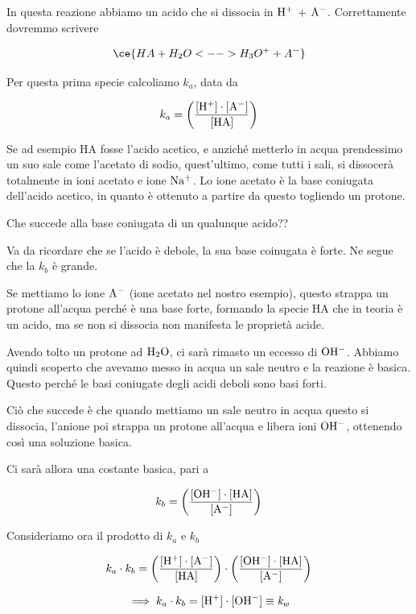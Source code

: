 
In questa reazione abbiamo un acido che si dissocia in $\rm H^+$ + $\rm A^-$. Correttamente dovremmo scrivere

$$\ce{HA + H_2O <--> H_3O^+ + A^-}$$

Per questa prima specie calcoliamo $k_a$, data da

$$k_a = \left( \rm \frac{[H^+] \cdot [A^-]}{[HA]} \right)$$

Se ad esempio HA fosse l'acido acetico, e anziché metterlo in acqua prendessimo un suo sale come l'acetato di sodio, quest'ultimo, come tutti i sali, si dissocerà totalmente in ioni acetato e ione $\rm Na^+$. Lo ione acetato è la base coniugata dell'acido acetico, in quanto è ottenuto a partire da questo togliendo un protone.

Che succede alla base coniugata di un qualunque acido??

Va da ricordare che se l'acido è debole, la sua base coinugata è forte. Ne segue che la $k_b$ è grande.

\vspace{0.2cm}

\vspace{0.2cm}Se mettiamo lo ione $\rm A^-$ (ione acetato nel nostro esempio), questo strappa un protone all'acqua perché è una base forte, formando la specie HA che in teoria è un acido, ma se non si dissocia non manifesta le proprietà acide.

Avendo tolto un protone ad $\rm H_2O$, ci sarà rimasto un eccesso di $\rm OH^-$. Abbiamo quindi scoperto che avevamo messo in acqua un sale neutro e la reazione è basica. Questo perché le basi coniugate degli acidi deboli sono basi forti.

Ciò che succede è che quando mettiamo un sale neutro in acqua questo si dissocia, l'anione poi strappa un protone all'acqua e libera ioni $\rm OH^-$, ottenendo così una soluzione basica.

Ci sarà allora una costante basica, pari a

$$k_b = \left( \rm \frac{[OH^-] \cdot [HA]}{[A^-]} \right)$$

Consideriamo ora il prodotto di $k_a$ e $k_b$

$$k_a \cdot k_b = \left( \rm \frac{[H^+] \cdot [A^-]}{[HA]} \right) \cdot \left( \rm \frac{[OH^-] \cdot [HA]}{[A^-]} \right)$$

$$\implies k_a \cdot k_b = \rm [H^+] \cdot [OH^-] \equiv \textit{k}_\textit{w}$$

